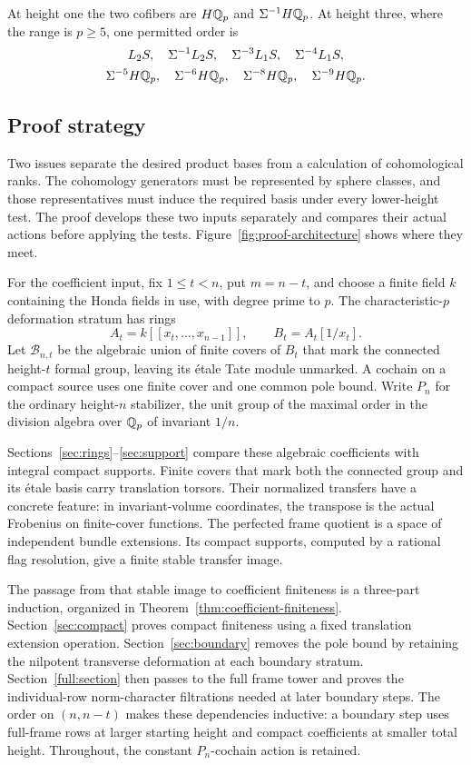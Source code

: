 At height one the two cofibers are \(H\mathbb Q_p\) and
\(\Sigma^{-1}H\mathbb Q_p\). At height three, where the range is \(p\geq5\),
one permitted order is
\[
\begin{gathered}
 L_2S,\quad\Sigma^{-1}L_2S,\quad
 \Sigma^{-3}L_1S,\quad\Sigma^{-4}L_1S,\\
 \Sigma^{-5}H\mathbb Q_p,\quad\Sigma^{-6}H\mathbb Q_p,\quad
 \Sigma^{-8}H\mathbb Q_p,\quad\Sigma^{-9}H\mathbb Q_p.
\end{gathered}
\]
\subsection{Proof strategy}
\label{intro:strategy}

Two issues separate the desired product bases from a calculation of
cohomological ranks. The cohomology generators must be represented by
sphere classes, and those representatives must induce the required
basis under every lower-height test. The proof develops these two
inputs separately and compares their actual actions before applying
the tests. Figure~\ref{fig:proof-architecture} shows where they meet.

For the coefficient input, fix \(1\leq t<n\), put \(m=n-t\), and
choose a finite field \(k\) containing the Honda fields in use, with
degree prime to \(p\). The characteristic-\(p\) deformation stratum
has rings
\[
A_t=k[[x_t,\ldots,x_{n-1}]],\qquad B_t=A_t[1/x_t].
\]
Let \(\mathcal B_{n,t}\) be the algebraic union of finite covers of
\(B_t\) that mark the connected height-\(t\) formal group, leaving
its \'etale Tate module unmarked. A cochain on a compact source uses
one finite cover and one common pole bound. Write \(P_n\) for the
ordinary height-\(n\) stabilizer, the unit group of the maximal order
in the division algebra over \(\mathbb Q_p\) of invariant \(1/n\).

Sections~\ref{sec:rings}--\ref{sec:support} compare these algebraic
coefficients with integral compact supports. Finite covers that mark
both the connected group and its \'etale basis carry translation
torsors. Their normalized transfers have a concrete feature: in
invariant-volume coordinates, the transpose is the actual Frobenius
on finite-cover functions. The perfected frame quotient is a space
of independent bundle extensions. Its compact supports, computed by
a rational flag resolution, give a finite stable transfer image.

The passage from that stable image to coefficient finiteness is a
three-part induction, organized in
Theorem~\ref{thm:coefficient-finiteness}. Section~\ref{sec:compact}
proves compact finiteness using a fixed translation extension
operation. Section~\ref{sec:boundary} removes the pole bound by
retaining the nilpotent transverse deformation at each boundary
stratum. Section~\ref{full:section} then passes to the full frame
tower and proves the individual-row norm-character filtrations
needed at later boundary steps. The order on \((n,n-t)\) makes these
dependencies inductive: a boundary step uses full-frame rows at
larger starting height and compact coefficients at smaller total
height. Throughout, the constant \(P_n\)-cochain action is retained.

